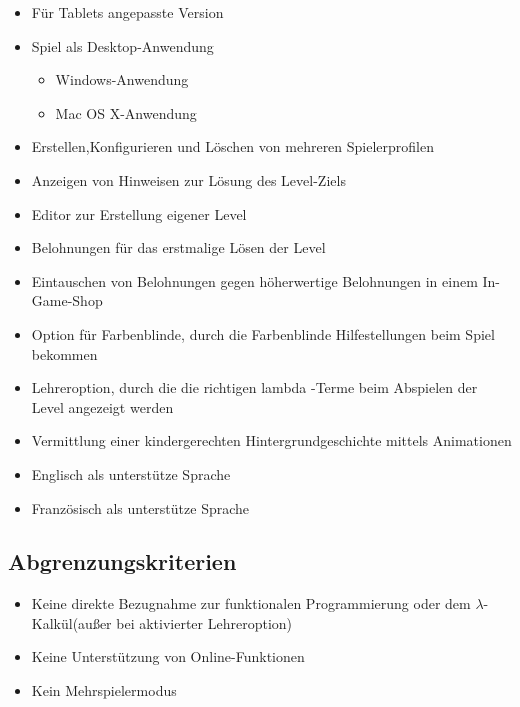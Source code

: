 \begin{itemize}
	\item Für Tablets angepasste Version
	\item Spiel als Desktop-Anwendung
	\begin{itemize}
		\item Windows-Anwendung
		\item Mac OS X-Anwendung
	\end{itemize}
	\item Erstellen,Konfigurieren und Löschen von mehreren Spielerprofilen
	\item Anzeigen von Hinweisen zur Lösung des Level-Ziels
	\item Editor zur Erstellung eigener Level
	\item Belohnungen für das erstmalige Lösen der Level
	\item Eintauschen von Belohnungen gegen höherwertige Belohnungen in einem In-Game-Shop
	\item Option für Farbenblinde, durch die Farbenblinde Hilfestellungen beim Spiel bekommen
	\item Lehreroption, durch die die richtigen lambda -Terme beim Abspielen der Level angezeigt 		  werden
	\item Vermittlung einer kindergerechten Hintergrundgeschichte mittels Animationen
	\item Englisch als unterstütze Sprache
	\item Französisch als unterstütze Sprache
\end{itemize}

\subsection{Abgrenzungskriterien}

\begin{itemize}
	\item Keine direkte Bezugnahme zur funktionalen Programmierung oder dem $\lambda$-Kalkül(außer  		  bei aktivierter Lehreroption) 
	\item Keine Unterstützung von Online-Funktionen
	\item Kein Mehrspielermodus
\end{itemize}
